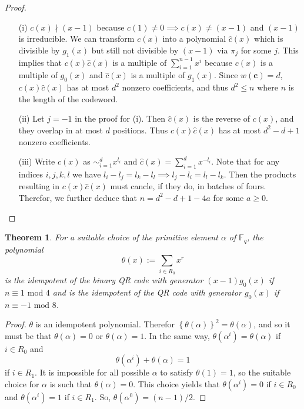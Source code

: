 \documentclass{article}
\newcommand{\F}{\mathbb{F}}
\renewcommand{\mod}{\text{ mod }}
\renewcommand{\=}{\equiv}
\newcommand{\set}[1]{\left\{ #1 \right\}}
\renewcommand{\v}{\mathbf}
\theoremstyle{plain}
\newtheorem{thm}{Theorem}[subsection]
\theoremstyle{definition}
\begin{document}
\begin{proof}
\hspace{0em}
\begin{enumerate}
  \item[(i)]
  $c(x) \nmid (x-1)$ because $c(1) \neq 0 \implies c(x) \neq (x-1)$ and $(x-1)$ is irreducible.
  We can transform $c(x)$ into a polynomial $\hat c(x)$ which is divisible by $g_1(x)$ but still not divisible by $(x-1)$
  via $\pi_j$ for some $j$.
  This implies that $c(x) \hat c(x)$ is a multiple of $\sum_{i=1}^{n-1} x^i$ because $c(x)$ is a multiple of $g_0(x)$ and $\hat c(x)$ is a multiple of $g_1(x)$.
  Since $w(\v c) = d$, $c(x) \hat c(x)$ has at most $d^2$ nonzero coefficients, and thus $d^2 \leq n$ where $n$ is the length of the codeword.

  \item[(ii)]
  Let $j = -1$ in the proof for (i). Then $\hat c(x)$ is the reverse of $c(x)$, and they overlap in at most $d$ positions.
  Thus $c(x) \hat c(x)$ has at most $d^2 - d + 1$ nonzero coefficients.

  \item[(iii)]
  Write $c(x)$ as $\sim_{i=1}^d x^{l_i}$ and $\hat c(x) = \sum_{i=1}^d x^{-l_i}$.
  Note that for any indices $i,j,k,l$ we have $l_i - l_j = l_k - l_l \implies l_j - l_i = l_l - l_k$.
  Then the products resulting in $c(x) \hat c(x)$ must cancle, if they do, in batches of fours.
  Therefor, we further deduce that $n = d^2 - d + 1 - 4a$ for some $a \geq 0$.
\end{enumerate}
\end{proof}

\begin{thm}
  \label{thm:suitable-theta}
  For a suitable choice of the primitive element $\alpha$ of $\F_q$, the polynomial
  $$ \theta(x) := \sum_{i \in R_0} x^r $$
  is the idempotent of the binary QR code with generator $(x-1) g_0(x)$ if $n \= 1 \mod 4$
  and is the idempotent of the QR code with generator $g_0(x)$ if $n \= -1 \mod 8$.
\end{thm}
\begin{proof}
$\theta$ is an idempotent polynomial.
Therefor $\set{\theta(\alpha)}^2 = \theta(\alpha)$, and so it must be that $\theta(\alpha) = 0$ or $\theta(\alpha) = 1$.
In the same way, $\theta(\alpha^i) = \theta(\alpha)$ if $i \in R_0$ and
$$ \theta(\alpha^i) + \theta(\alpha) = 1 $$
if $i \in R_1$.
It is impossible for all possible $\alpha$ to satisfy $\theta(1) = 1$, so the suitable choice for $\alpha$ is such that $\theta(\alpha) = 0$.
This choice yields that $\theta(\alpha^i) = 0$ if $i \in R_0$ and $\theta(\alpha^i) = 1$ if $i \in R_1$.
So, $\theta(\alpha^0) = (n-1)/2$.
\end{proof}
\end{document}
